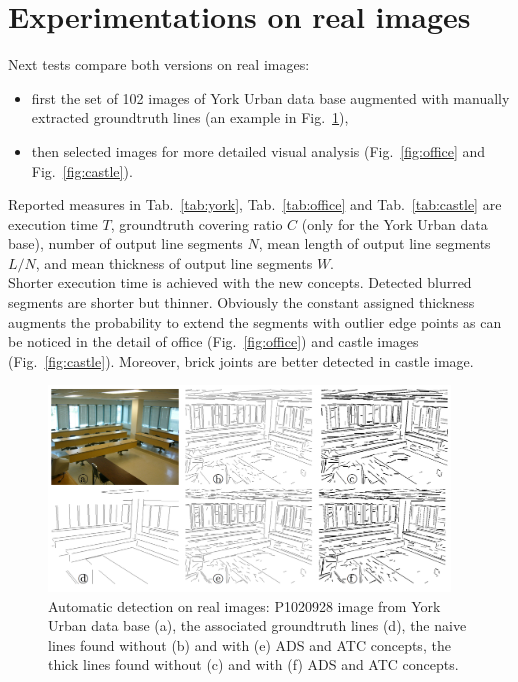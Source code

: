 \documentclass[11pt]{article}
\begin{document}
\pagebreak

\section{Experimentations on real images}

Next tests compare both versions on real images:
\begin{itemize}
\item first the set of 102 images of York Urban data base \cite{Denis08}
augmented with manually extracted groundtruth lines (an example in
Fig.~\ref{fig:york}),
\item then selected images for more detailed visual analysis
(Fig.~\ref{fig:office} and Fig.~\ref{fig:castle}).
\end{itemize}
Reported measures in Tab.~\ref{tab:york}, Tab.~\ref{tab:office} and
Tab.~\ref{tab:castle}
are execution time $T$, groundtruth covering
ratio $C$ (only for the York Urban data base), number of output line
segments $N$, mean length of output line segments $L/N$, and mean
thickness of output line segments $W$. \\

Shorter execution time is achieved with the new concepts.
Detected blurred segments are shorter but thinner.
Obviously the constant assigned thickness augments the probability to extend
the segments with outlier edge points as can be noticed in the detail of
office (Fig.~\ref{fig:office}) and castle images (Fig.~\ref{fig:castle}).
Moreover, brick joints are better detected in castle image.

\begin{figure}[h]
  \begin{center}
  \includegraphics[width=0.95\textwidth]{Images/expe0.png}
  \end{center}
  \caption{Automatic detection on real images:
    P1020928 image from York Urban data base \cite{Denis08} (a),
    the associated groundtruth lines (d),
    the naive lines found without (b) and with (e) ADS and ATC concepts,
    the thick lines found without (c) and with (f) ADS and ATC concepts.}
  \label{fig:york}
\end{figure}
\end{document}
